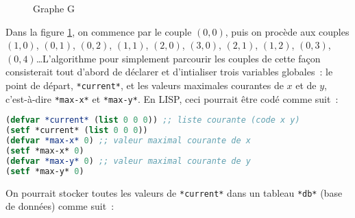 \documentclass{article}
\begin{document}
\begin{figure}[h!]
  \centering
  \caption{Graphe G}
  \label{fig:codage-zigzag}
\end{figure}


Dans la figure \ref{fig:codage-zigzag}, on commence par le couple $(0,0)$, puis on procède aux couples $(1,0)$, $(0,1)$, $(0,2)$, $(1,1)$, $(2,0)$, $(3,0)$, $(2,1)$, $(1,2)$, $(0,3)$, $(0,4)$\ldots L'algorithme pour simplement parcourir les couples de cette façon consisterait tout d'abord de déclarer et d'intialiser trois variables globales~: le point de départ, \lstinline!*current*!, et les valeurs maximales courantes de $x$ et de $y$, c'est-à-dire \lstinline!*max-x*! et \lstinline!*max-y*!. En LISP, ceci pourrait être codé comme suit~:

\begin{lstlisting}[language=Lisp]
(defvar *current* (list 0 0 0)) ;; liste courante (code x y)
(setf *current* (list 0 0 0)) 
(defvar *max-x* 0) ;; valeur maximal courante de x
(setf *max-x* 0)
(defvar *max-y* 0) ;; valeur maximal courante de y
(setf *max-y* 0)
\end{lstlisting}

On pourrait stocker toutes les valeurs de \lstinline!*current*! dans un tableau \lstinline!*db*! (base de données) comme suit~:
\end{document}
